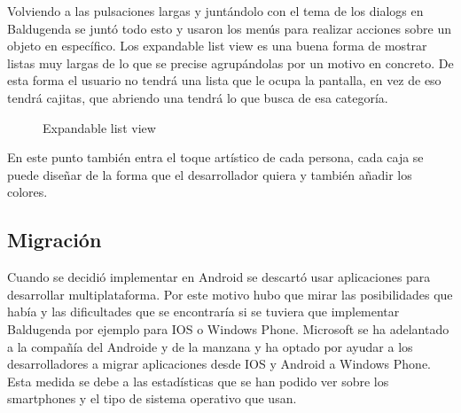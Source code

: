 Volviendo a las pulsaciones largas y juntándolo con el tema de los dialogs en Baldugenda se juntó todo esto y usaron los menús para realizar acciones sobre un objeto en específico.
Los expandable list view es una buena forma de mostrar listas muy largas de lo que se precise agrupándolas por un motivo en concreto.
De esta forma el usuario no tendrá una lista que le ocupa la pantalla, en vez de eso tendrá cajitas, que abriendo una tendrá lo que busca de esa categoría.


\begin{figure}[H] 
  \begin{center} 
    \caption{Expandable list view} 
    \label{fig:ExpandableList} 
  \end{center} 
\end{figure}

En este punto también entra el toque artístico de cada persona, cada caja se puede diseñar de la forma que el desarrollador quiera y también añadir los colores.

\subsection{Migración}
\label{subsecc:Migración}

Cuando se decidió implementar en Android se descartó usar aplicaciones para desarrollar multiplataforma.
Por este motivo hubo que mirar las posibilidades que había y las dificultades que se encontraría si se tuviera que implementar Baldugenda por ejemplo para IOS o Windows Phone.
Microsoft se ha adelantado a la compañía del Androide y de la manzana y ha optado por ayudar a los desarrolladores a migrar aplicaciones desde IOS y Android a Windows Phone.
Esta medida se debe a las estadísticas que se han podido ver sobre los smartphones y el tipo de sistema operativo que usan.

